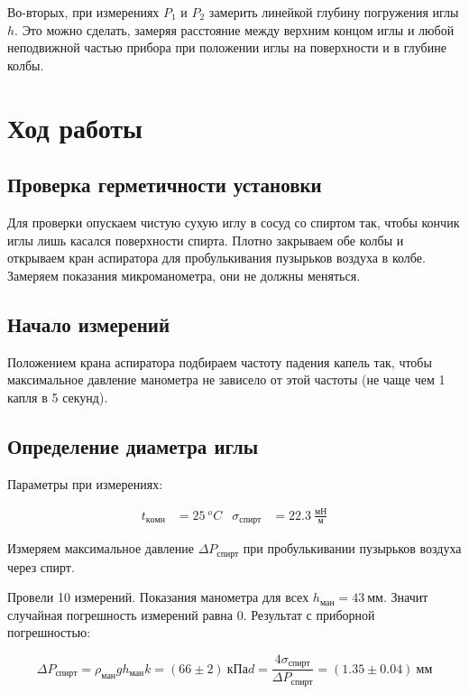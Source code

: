 \documentclass[a4paper, 12pt]{article}
\begin{document}
	Во-вторых, при измерениях $ P_1 $ и $ P_2 $ замерить линейкой  глубину погружения иглы $ h $. Это можно сделать, замеряя расстояние между верхним концом иглы и любой неподвижной частью прибора при положении иглы на поверхности и в глубине колбы.

	\section{Ход работы}

		\subsection{Проверка герметичности установки}

			Для проверки опускаем чистую сухую иглу в сосуд со спиртом так, чтобы кончик иглы лишь касался поверхности спирта. Плотно закрываем обе колбы и открываем кран аспиратора для пробулькивания пузырьков воздуха в колбе. Замеряем показания микроманометра, они не должны меняться.

		\subsection{Начало измерений}

			Положением крана аспиратора подбираем частоту падения капель так, чтобы максимальное давление манометра не зависело от этой частоты (не чаще чем 1 капля в 5 секунд).

		\subsection{Определение диаметра иглы}
			\label{needle_diam}

			Параметры при измерениях:

			\begin{align*}
				t_{комн} &= 25~^oC & \sigma_{спирт} &= 22.3~\frac{мН}{м}
			\end{align*}

			Измеряем максимальное давление $\Delta P_{спирт}$ при пробулькивании пузырьков воздуха через спирт.

			Провели 10 измерений. Показания манометра для всех $h_{ман} = 43~мм$. Значит случайная погрешность измерений равна 0. Результат с приборной погрешностью:

			\begin{equation*}
				\Delta P_{спирт} = \rho_{ман} g h_{ман} k = (66 \pm 2)~кПа
				d = \frac{4 \sigma_{спирт}}{\Delta P_{спирт}} = (1.35 \pm 0.04)~мм
			\end{equation*}
\end{document}
